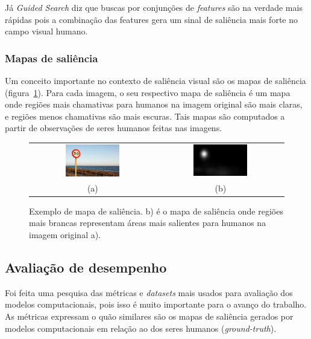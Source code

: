 \documentclass[11pt]{article}
\newcommand{\tit}[1]{\textit{#1}}
\begin{document}
Já \tit{Guided Search} diz que buscas por conjunções de \tit{features} são na
verdade mais rápidas pois a combinação das features gera um sinal de
saliência mais forte no campo visual humano.

\subsubsection{Mapas de saliência}
Um conceito importante no contexto de saliência visual são os mapas
de saliência (figura~\ref{fig:salmap}).
Para cada imagem, o seu respectivo mapa de saliência é um mapa onde
regiões mais chamativas para humanos na imagem original são mais claras,
e regiões menos chamativas são mais escuras.
Tais mapas são computados a partir de observações de seres humanos feitas
nas imagens.

\begin{figure}[H]
\begin{center}
		\begin{tabular} {cc}
		\includegraphics[width=0.45\textwidth]{./img/traffic_sign_s.jpg} &
		\includegraphics[width=0.45\textwidth]{./img/traffic_sign_m.jpg}\\
        (a) & (b)
		\end{tabular}
\end{center}
\caption{Exemplo de mapa de saliência. b) é o mapa de saliência onde 
    regiões mais brancas representam áreas
    mais salientes para humanos na imagem original a).}
\label{fig:salmap}
\end{figure}

\subsection{Avaliação de desempenho}
Foi feita uma pesquisa das métricas e \tit{datasets} mais usados para
avaliação dos modelos computacionais, pois isso
é muito importante para o avanço do trabalho.
As métricas expressam o quão similares são os mapas de saliência gerados
por modelos computacionais em relação ao dos seres humanos
(\tit{ground-truth}).
\end{document}
